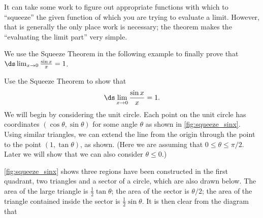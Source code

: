 
It can take some work to figure out appropriate functions with which to ``squeeze'' the given function of which you are trying to evaluate a limit. However, that is generally the only place work is necessary; the theorem makes the ``evaluating the limit part'' very simple. 

We use the Squeeze Theorem in the following example to finally prove that $\ds \lim_{x\to 0} \frac{\sin x}{x} = 1$.

\begin{example}\label{ex_limit_sinx_prove}
Use the Squeeze Theorem to show that
\[\ds \lim_{x\to 0} \frac{\sin x}{x} = 1.\]
\solution
We will begin by considering the unit circle. Each point on the unit circle has coordinates $(\cos \theta,\sin \theta)$ for some angle $\theta$ as shown in \autoref{fig:squeeze_sinx}. Using similar triangles, we can extend the line from the origin through the point to the point $(1,\tan \theta)$, as shown. (Here we are assuming that $0\leq \theta \leq \pi/2$. Later we will show that we can also consider $\theta \leq 0$.)


\autoref{fig:squeeze_sinx} shows three regions have been constructed in the first quadrant, two triangles and a sector of a circle, which are also drawn below. The area of the large triangle is $\frac12\tan\theta$; the area of the sector is $\theta/2$; the area of the triangle contained inside the sector is $\frac12\sin\theta$. It is then clear from the diagram that 


\end{example}
